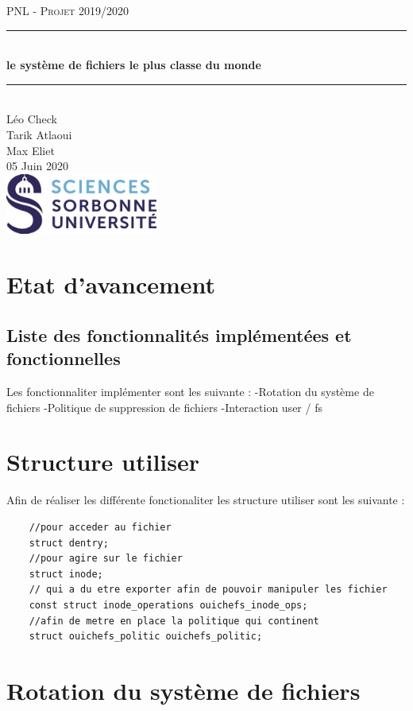 \documentclass{article}
\date{\today}
\author{Léo Check\\ Tarik Atlaoui \\ Max Eliet}
\begin{document}
\begin{titlepage}
	\enlargethispage{2cm}
	\newcommand{\HRule}{\rule{\linewidth}{0.5mm}}
	\center
	\textsc{\LARGE
	PNL - Projet 2019/2020 
	} \\[1cm]
	\HRule \\[0.4cm]
	{ \huge \bfseries le système de fichiers le plus classe du monde \\[0.15cm] }
	\HRule \\[4cm]
	\large{Léo Check \\[3mm] Tarik Atlaoui \\[3mm] Max Eliet} \\[3cm]
	05 Juin 2020 \\[3cm]
	\hfill \includegraphics[width=5cm]{logoSU.jpg}
\end{titlepage}

	\newpage
	\section{Etat d'avancement}
	\subsection{Liste des fonctionnalités implémentées et fonctionnelles}
	Les fonctionnaliter implémenter sont les suivante :
	\newline	
	-Rotation du système de fichiers
	\newline
	-Politique de suppression de fichiers
	\newline
	-Interaction user / fs
	\section{Structure utiliser}
	Afin de réaliser les différente fonctionaliter les structure utiliser sont les suivante :
	\begin{lstlisting}
	//pour acceder au fichier 
	struct dentry;
	//pour agire sur le fichier 
	struct inode;
	// qui a du etre exporter afin de pouvoir manipuler les fichier
	const struct inode_operations ouichefs_inode_ops;
	//afin de metre en place la politique qui continent
	struct ouichefs_politic ouichefs_politic;
	\end{lstlisting}
	\section{Rotation du système de fichiers}
\end{document}
